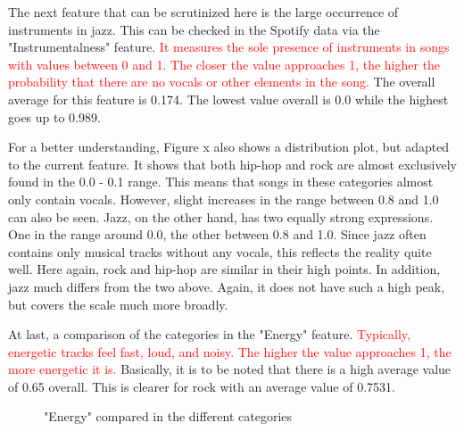 The next feature that can be scrutinized here is the large occurrence of instruments in jazz.
This can be checked in the Spotify data via the "Instrumentalness" feature.
\textcolor{red}{It measures the sole presence of instruments in songs with values between 0 and 1.
The closer the value approaches 1, the higher the probability that there are no vocals or other
elements in the song.} The overall average for this feature is 0.174.
The lowest value overall is 0.0 while the highest goes up to 0.989.


For a better understanding, Figure x  also shows a distribution plot,
but adapted to the current feature.
It shows that both hip-hop and rock are almost exclusively found in the 0.0 - 0.1 range.
This means that songs in these categories almost only contain vocals.
However, slight increases in the range between 0.8 and 1.0 can also be seen. Jazz,
on the other hand, has two equally strong expressions. One in the range around 0.0,
the other between 0.8 and 1.0. Since jazz often contains only musical tracks without
any vocals, this reflects the reality quite well.
Here again, rock and hip-hop are similar in their high points.
In addition, jazz much differs from the two above. Again, it does not have such a high peak, 
but covers the scale much more broadly.

At last, a comparison of the categories in the "Energy" feature.
\textcolor{red}{Typically, energetic tracks feel fast, loud, and noisy.
The higher the value approaches 1, the more energetic it is.}
Basically, it is to be noted that there is a high average value of 0.65 overall.
This is clearer for rock with an average value of 0.7531.

\begin{figure}[H]
    \centering
    \qquad
    \caption{"Energy" compared in the different categories}%
    \label{du_dp_bp_enrg_categorie_dependent}%
\end{figure}

